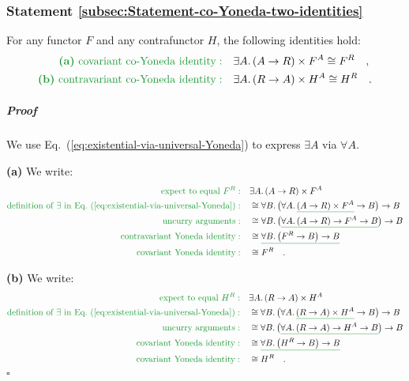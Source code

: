 \subsubsection{Statement \label{subsec:Statement-co-Yoneda-two-identities}\ref{subsec:Statement-co-Yoneda-two-identities}}

For any functor $F$ and any contrafunctor $H$, the following identities
hold:
\begin{align*}
{\color{greenunder}\text{\textbf{(a)} }\text{covariant co-Yoneda identity}:}\quad & \exists A.\,(A\rightarrow R)\times F^{A}\cong F^{R}\quad,\\
{\color{greenunder}\text{\textbf{(b)} }\text{contravariant co-Yoneda identity}:}\quad & \exists A.\,(R\rightarrow A)\times H^{A}\cong H^{R}\quad.
\end{align*}


\subparagraph{Proof}

We use Eq.~(\ref{eq:existential-via-universal-Yoneda}) to express
$\exists A$ via $\forall A$. 

\textbf{(a)} We write:
\begin{align*}
{\color{greenunder}\text{expect to equal }F^{R}:}\quad & \exists A.\,(A\rightarrow R)\times F^{A}\\
{\color{greenunder}\text{definition of }\exists\text{ in Eq.~}(\ref{eq:existential-via-universal-Yoneda}):}\quad & \cong\forall B.\,\big(\forall A.\,\gunderline{(A\rightarrow R)\times F^{A}}\rightarrow B\big)\rightarrow B\\
{\color{greenunder}\text{uncurry arguments}:}\quad & \cong\forall B.\,\big(\gunderline{\forall A.\,(A\rightarrow R)\rightarrow F^{A}\rightarrow B}\big)\rightarrow B\\
{\color{greenunder}\text{contravariant Yoneda identity}:}\quad & \cong\gunderline{\forall B.\,\big(F^{R}\rightarrow B\big)\rightarrow B}\\
{\color{greenunder}\text{covariant Yoneda identity}:}\quad & \cong F^{R}\quad.
\end{align*}

\textbf{(b)} We write:
\begin{align*}
{\color{greenunder}\text{expect to equal }H^{R}:}\quad & \exists A.\,(R\rightarrow A)\times H^{A}\\
{\color{greenunder}\text{definition of }\exists\text{ in Eq.~}(\ref{eq:existential-via-universal-Yoneda}):}\quad & \cong\forall B.\,\big(\forall A.\,\gunderline{(R\rightarrow A)\times H^{A}}\rightarrow B\big)\rightarrow B\\
{\color{greenunder}\text{uncurry arguments}:}\quad & \cong\forall B.\,\big(\gunderline{\forall A.\,(R\rightarrow A)\rightarrow H^{A}\rightarrow B}\big)\rightarrow B\\
{\color{greenunder}\text{covariant Yoneda identity}:}\quad & \cong\gunderline{\forall B.\,\big(H^{R}\rightarrow B\big)\rightarrow B}\\
{\color{greenunder}\text{covariant Yoneda identity}:}\quad & \cong H^{R}\quad.
\end{align*}
$\square$

